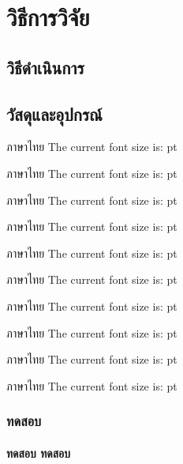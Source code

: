 \chapter{วิธีการวิจัย}
\section{วิธีดำเนินการ}
\section{วัสดุและอุปกรณ์}

\makeatletter
\newcommand\thefontsize[1]{{#1 \string#1 ภาษาไทย The current font size is: \f@size pt\par }}
\makeatother

\thefontsize\tiny
\thefontsize\scriptsize
\thefontsize\footnotesize
\thefontsize\small
\thefontsize\normalsize 
\thefontsize\large
\thefontsize\Large
\thefontsize\LARGE
\thefontsize\huge
\thefontsize\Huge

\subsection{ทดสอบ}


\subsubsection{ทดสอบ ทดสอบ}

